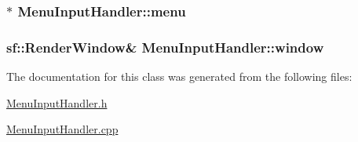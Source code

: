 \subsubsection[{menu}]{$\ast$ Menu\+Input\+Handler\+::menu\hspace{0.3cm}{\ttfamily [private]}}\label{class_menu_input_handler_adda8b05fe971a0ed749bb0037d3ba4bd}
\hypertarget{class_menu_input_handler_a2d53ce9f0554202b62c1640ef95e799b}{}
\subsubsection[{window}]{\setlength{\rightskip}{0pt plus 5cm}sf\+::\+Render\+Window\& Menu\+Input\+Handler\+::window\hspace{0.3cm}{\ttfamily [private]}}\label{class_menu_input_handler_a2d53ce9f0554202b62c1640ef95e799b}


The documentation for this class was generated from the following files\+:\begin{DoxyCompactItemize}
\item 
\hyperlink{_menu_input_handler_8h}{Menu\+Input\+Handler.\+h}\item 
\hyperlink{_menu_input_handler_8cpp}{Menu\+Input\+Handler.\+cpp}\end{DoxyCompactItemize}
